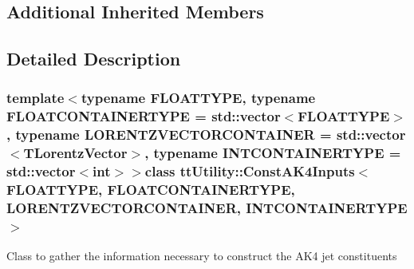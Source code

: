 \subsection*{Additional Inherited Members}


\subsection{Detailed Description}
\subsubsection*{template$<$typename F\-L\-O\-A\-T\-T\-Y\-P\-E, typename F\-L\-O\-A\-T\-C\-O\-N\-T\-A\-I\-N\-E\-R\-T\-Y\-P\-E = std\-::vector$<$\-F\-L\-O\-A\-T\-T\-Y\-P\-E$>$, typename L\-O\-R\-E\-N\-T\-Z\-V\-E\-C\-T\-O\-R\-C\-O\-N\-T\-A\-I\-N\-E\-R = std\-::vector$<$\-T\-Lorentz\-Vector$>$, typename I\-N\-T\-C\-O\-N\-T\-A\-I\-N\-E\-R\-T\-Y\-P\-E = std\-::vector$<$int$>$$>$class tt\-Utility\-::\-Const\-A\-K4\-Inputs$<$ F\-L\-O\-A\-T\-T\-Y\-P\-E, F\-L\-O\-A\-T\-C\-O\-N\-T\-A\-I\-N\-E\-R\-T\-Y\-P\-E, L\-O\-R\-E\-N\-T\-Z\-V\-E\-C\-T\-O\-R\-C\-O\-N\-T\-A\-I\-N\-E\-R, I\-N\-T\-C\-O\-N\-T\-A\-I\-N\-E\-R\-T\-Y\-P\-E $>$}

Class to gather the information necessary to construct the A\-K4 jet constituents 

